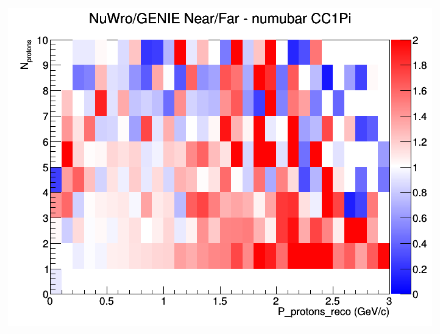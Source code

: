 \documentclass[12pt]{article}
\begin{document}
\begin{figure}[h]
\endminipage
{}
\includegraphics[width=\linewidth]{eff_N_P/LAr/protons/ratios/CC1Pi_NuWro_GENIE_numubar_NF_N_P.png}
\endminipage
\newline
\end{figure}
\clearpage
\end{document}
